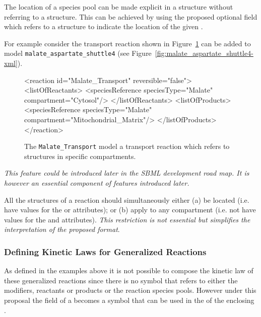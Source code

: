 \documentclass{cekarticle}
\begin{document}
The location of a species pool can be made explicit in a  structure
without referring to a  structure.  This can be achieved by using the proposed optional
 field which refers to a  structure to indicate the 
location of the given .

For example consider the transport reaction shown in Figure~\ref{fig:Malate_Transport-xml}
can be added to model \texttt{malate\_aspartate\_shuttle4}
(see Figure~\ref{fig:malate_aspartate_shuttle4-xml}).

\begin{figure}[h]
\begin{example}
<reaction id="Malate_Transport" reversible="false">
    <listOfReactants>
        <speciesReference speciesType="Malate" compartment="Cytosol"/>
    </listOfReactants>
    <listOfProducts>
        <speciesReference speciesType="Malate" compartment="Mitochondrial_Matrix"/>
    </listOfProducts>
</reaction>
\end{example}
\caption{The \texttt{Malate\_Transport} model a transport reaction which refers to 
structures in specific compartments.} 
\label{fig:Malate_Transport-xml}
\end{figure}


\emph{This feature could be introduced later in the SBML development road map.
It is however an essential component of features introduced later.}

All the  structures of a reaction should simultaneously either
(a) be located (i.e. have values for the  or  attributes);
or (b) apply to any compartment (i.e. not have values for the  and 
attributes). \emph{This restriction is not essential but simplifies the interpretation of
the proposed format}.

\subsubsection{Defining Kinetic Laws for Generalized Reactions}

As defined in the examples above it is not possible to compose the kinetic law of these generalized
reactions since there is no symbol that refers to either the modifiers, reactants or products or the
reaction species pools.  However under this proposal the  field of a
 becomes a symbol that can be used in the  of the 
enclosing .
\end{document}
